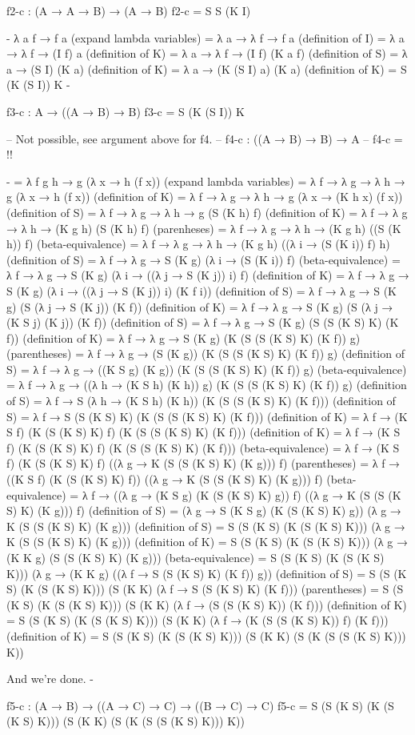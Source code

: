 f2-c : (A → A → B) → (A → B)
f2-c = S S (K I)

{-
  λ a f → f a
 (expand lambda variables)
= λ a → λ f → f a
 (definition of I)
= λ a → λ f → (I f) a
 (definition of K)
= λ a → λ f → (I f) (K a f)
 (definition of S)
= λ a → (S I) (K a)
 (definition of K)
= λ a → (K (S I) a) (K a)
 (definition of K)
= S (K (S I)) K
-}

f3-c : A → ((A → B) → B)
f3-c = S (K (S I)) K

-- Not possible, see argument above for f4.
-- f4-c : ((A → B) → B) → A
-- f4-c = {!!}

{-
= λ f g h → g (λ x → h (f x))
 (expand lambda variables)
= λ f → λ g → λ h → g (λ x → h (f x))
 (definition of K)
= λ f → λ g → λ h → g (λ x → (K h x) (f x))
 (definition of S)
= λ f → λ g → λ h → g (S (K h) f)
 (definition of K)
= λ f → λ g → λ h → (K g h) (S (K h) f)
 (parenheses)
= λ f → λ g → λ h → (K g h) ((S (K h)) f)
 (beta-equivalence)
= λ f → λ g → λ h → (K g h) ((λ i → (S (K i)) f) h)
 (definition of S)
= λ f → λ g → S (K g) (λ i → (S (K i)) f)
 (beta-equivalence)
= λ f → λ g → S (K g) (λ i → ((λ j → S (K j)) i) f)
 (definition of K)
= λ f → λ g → S (K g) (λ i → ((λ j → S (K j)) i) (K f i))
 (definition of S)
= λ f → λ g → S (K g) (S (λ j → S (K j)) (K f))
 (definition of K)
= λ f → λ g → S (K g) (S (λ j → (K S j) (K j)) (K f))
 (definition of S)
= λ f → λ g → S (K g) (S (S (K S) K) (K f))
 (definition of K)
= λ f → λ g → S (K g) (K (S (S (K S) K) (K f)) g)
 (parentheses)
= λ f → λ g → (S (K g)) (K (S (S (K S) K) (K f)) g)
 (definition of S)
= λ f → λ g → ((K S g) (K g)) (K (S (S (K S) K) (K f)) g)
 (beta-equivalence)
= λ f → λ g → ((λ h → (K S h) (K h)) g) (K (S (S (K S) K) (K f)) g)
 (definition of S)
= λ f → S (λ h → (K S h) (K h)) (K (S (S (K S) K) (K f)))
 (definition of S)
= λ f → S (S (K S) K) (K (S (S (K S) K) (K f)))
 (definition of K)
= λ f → (K S f) (K (S (K S) K) f) (K (S (S (K S) K) (K f)))
 (definition of K)
= λ f → (K S f) (K (S (K S) K) f) (K (S (S (K S) K) (K f)))
 (beta-equivalence)
= λ f → (K S f) (K (S (K S) K) f) ((λ g → K (S (S (K S) K) (K g))) f)
 (parentheses)
= λ f → ((K S f) (K (S (K S) K) f)) ((λ g → K (S (S (K S) K) (K g))) f)
 (beta-equivalence)
= λ f → ((λ g → (K S g) (K (S (K S) K) g)) f) ((λ g → K (S (S (K S) K) (K g))) f)
 (definition of S)
= (λ g → S (K S g) (K (S (K S) K) g)) (λ g → K (S (S (K S) K) (K g)))
 (definition of S)
= S (S (K S) (K (S (K S) K))) (λ g → K (S (S (K S) K) (K g)))
 (definition of K)
= S (S (K S) (K (S (K S) K))) (λ g → (K K g) (S (S (K S) K) (K g)))
 (beta-equivalence)
= S (S (K S) (K (S (K S) K))) (λ g → (K K g) ((λ f → S (S (K S) K) (K f)) g))
 (definition of S)
= S (S (K S) (K (S (K S) K))) (S (K K) (λ f → S (S (K S) K) (K f)))
 (parentheses)
= S (S (K S) (K (S (K S) K))) (S (K K) (λ f → (S (S (K S) K)) (K f)))
 (definition of K)
= S (S (K S) (K (S (K S) K))) (S (K K) (λ f → (K (S (S (K S) K)) f) (K f)))
 (definition of K)
= S (S (K S) (K (S (K S) K))) (S (K K) (S (K (S (S (K S) K))) K))

And we're done.
-}


f5-c : (A → B) → ((A → C) → C) → ((B → C) → C)
f5-c = S (S (K S) (K (S (K S) K))) (S (K K) (S (K (S (S (K S) K))) K))
